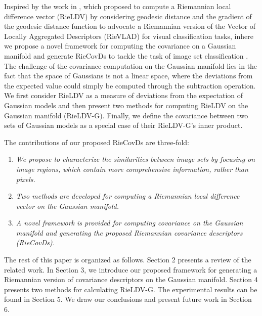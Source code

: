 \documentclass[review]{elsarticle}
\begin{document}
Inspired by the work in  \cite{faraki2015more}, which proposed to compute a Riemannian local difference vector (RieLDV) by considering geodesic distance and the gradient of the geodesic distance function to advocate a Riemannian version of the Vector of Locally Aggregated Descriptors (RieVLAD) for visual classification tasks, inhere we  propose  a novel framework for computing the covariance on a Gaussian manifold \cite{wang2016towards} and generate RieCovDs to tackle the task of image set classification \cite{wang2012covariance,zheng2017image,tan2018regularized}.
The challenge of the covariance computation on the Gaussian manifold \cite{wang2016towards} lies in the fact that the space of Gaussians is not a linear space, where the deviations from the expected value could simply be computed through the subtraction operation. We first consider RieLDV\cite{faraki2015more} as a measure of deviations from the expectation of Gaussian models and then present two methods for computing RieLDV on the Gaussian manifold (RieLDV-G). Finally, we define the covariance between two sets of Gaussian models as a special case of their RieLDV-G's inner product.

 	The contributions of our proposed RieCovDs are three-fold:
\begin {enumerate}
\item \emph{We propose to characterize the similarities between image sets by focusing on image regions, which contain more comprehensive information, rather than pixels.}
\item \emph{Two methods are developed for computing a Riemannian local difference vector on the Gaussian manifold.}
\item \emph{A novel framework is provided for computing covariance on the Gaussian manifold and generating the proposed Riemannian covariance descriptors (RieCovDs).}
\end {enumerate}

	\indent The rest of this paper is organized as follows. Section 2 presents a review of the related work. In Section 3, we introduce our proposed framework for generating a Riemannian version of covariance descriptors on the Gaussian manifold. Section 4 presents two methods for calculating RieLDV-G. The experimental results can be found in Section 5. We draw our conclusions and present future work in Section 6.
\end{document}
